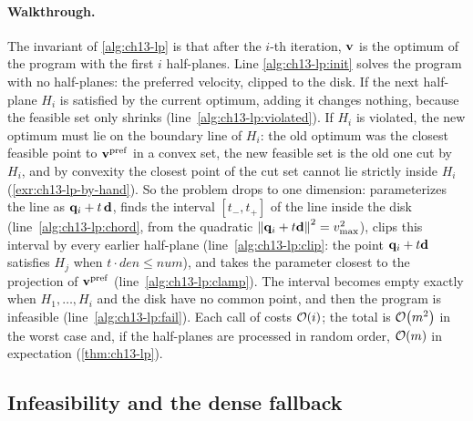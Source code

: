 \paragraph{Walkthrough.}
The invariant of \cref{alg:ch13-lp} is that after the $i$-th iteration,
$\mathbf{v}$ is the optimum of the program with the first $i$ half-planes. Line
\ref{alg:ch13-lp:init} solves the program with no half-planes: the preferred
velocity, clipped to the disk. If the next half-plane $H_i$ is satisfied by
the current optimum, adding it changes nothing, because the feasible set
only shrinks (line~\ref{alg:ch13-lp:violated}). If $H_i$ is violated, the
new optimum must lie on the boundary line of $H_i$: the old optimum was the
closest feasible point to $\mathbf{v}^{\mathrm{pref}}$ in a convex set, the new
feasible set is the old one cut by $H_i$, and by convexity the closest point
of the cut set cannot lie strictly inside $H_i$ (\cref{exr:ch13-lp-by-hand}).
So the problem drops to one dimension: \OrcaLPLine parameterizes the line as
$\mathbf{q}_i + t\,\mathbf{d}$, finds the interval $[t_-, t_+]$ of the line inside
the disk (line~\ref{alg:ch13-lp:chord}, from the quadratic
$\left\lVert \mathbf{q}_i + t\mathbf{d} \right\rVert^2 = v_{\max}^2$), clips this interval by
every earlier half-plane (line~\ref{alg:ch13-lp:clip}: the point
$\mathbf{q}_i + t\mathbf{d}$ satisfies $H_j$ when $t\cdot\mathit{den} \le
\mathit{num}$), and takes the parameter closest to the projection of
$\mathbf{v}^{\mathrm{pref}}$ (line~\ref{alg:ch13-lp:clamp}). The interval becomes
empty exactly when $H_1, \dots, H_i$ and the disk have no common point, and
then the program is infeasible (line~\ref{alg:ch13-lp:fail}). Each call of
\OrcaLPLine costs $\mathcal{O}\!\left(i\right)$; the total is $\mathcal{O}\!\left(m^2\right)$ in the worst case
and, if the half-planes are processed in random order, $\mathcal{O}\!\left(m\right)$ in
expectation (\cref{thm:ch13-lp}).

\subsection{Infeasibility and the dense fallback}
\label{sec:ch13-dense}

